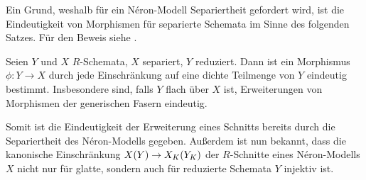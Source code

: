 Ein Grund, weshalb für ein Néron-Modell Separiertheit gefordert wird,
ist die Eindeutigkeit von Morphismen für separierte Schemata im Sinne
des folgenden Satzes. Für den Beweis siehe
\cite[Corollary~9.9]{wedhorn}.
\begin{Satz}\label{thm:erweindeutig}
  Seien $Y$ und $X$ $R$-Schemata, $X$ separiert, $Y$
  reduziert.
  Dann ist ein Morphismus $\phi\colon Y\to X$ durch jede
  Einschränkung auf eine dichte Teilmenge von $Y$ eindeutig bestimmt.
  Insbesondere sind, falls $Y$ flach über $X$ ist, Erweiterungen von
  Morphismen der generischen Fasern eindeutig.

\end{Satz}
Somit ist die Eindeutigkeit der Erweiterung eines Schnitts bereits
durch die Separiertheit des Néron-Modells gegeben. Außerdem ist nun
bekannt, dass die kanonische Einschränkung $X(Y)\to X_{K}(Y_{K})$ der
$R$-Schnitte eines Néron-Modells $X$ nicht nur für glatte, sondern
auch für reduzierte Schemata $Y$ injektiv ist.

